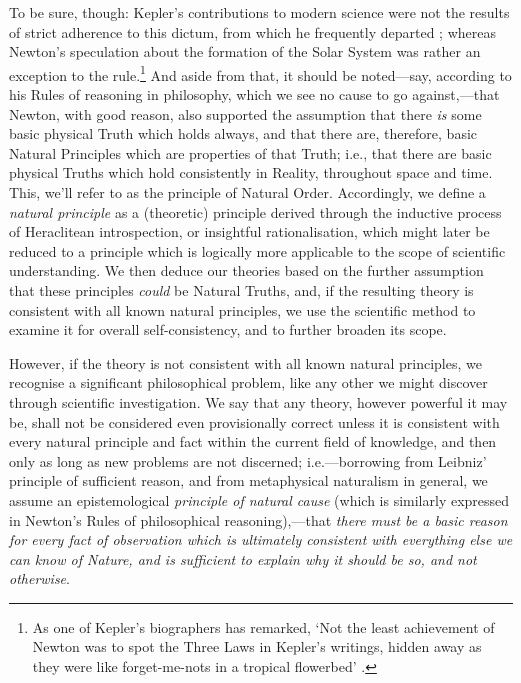 To be sure, though: Kepler's contributions to modern science were not the results of strict adherence to this dictum, from which he frequently departed \cite{Koestler1959}; whereas Newton's speculation about the formation of the Solar System was rather an exception to the rule.\footnote{As one of Kepler's biographers has remarked, `Not the least achievement of Newton was to spot the Three Laws in Kepler's writings, hidden away as they were like forget-me-nots in a tropical flowerbed' \cite{Koestler1959}.} And aside from that, it should be noted---say, according to his Rules of reasoning in philosophy, which we see no cause to go against,---that Newton, with good reason, also supported the assumption that there \textit{is} some basic physical Truth which holds always, and that there are, therefore, basic Natural Principles which are properties of that Truth; i.e., that there are basic physical Truths which hold consistently in Reality, throughout space and time. This, we'll refer to as the principle of Natural Order. Accordingly, we define a \textit{natural principle} as a (theoretic) principle derived through the inductive process of Heraclitean introspection, or insightful rationalisation, which might later be reduced to a principle which is logically more applicable to the scope of scientific understanding. We then deduce our theories based on the further assumption that these principles \textit{could} be Natural Truths, and, if the resulting theory is consistent with all known natural principles, we use the scientific method to examine it for overall self-consistency, and to further broaden its scope. 

However, if the theory is not consistent with all known natural principles, we recognise a significant philosophical problem, like any other we might discover through scientific investigation. We say that any theory, however powerful it may be, shall not be considered even provisionally correct unless it is consistent with every natural principle and fact within the current field of knowledge, and then only as long as new problems are not discerned; i.e.---borrowing from Leibniz' principle of sufficient reason, and from metaphysical naturalism in general, we assume an epistemological \textit{principle of natural cause} (which is similarly expressed in Newton's Rules of philosophical reasoning),---that \textit{there must be a basic reason for every fact of observation which is ultimately consistent with everything else we can know of Nature, and is sufficient to explain why it should be so, and not otherwise}.

